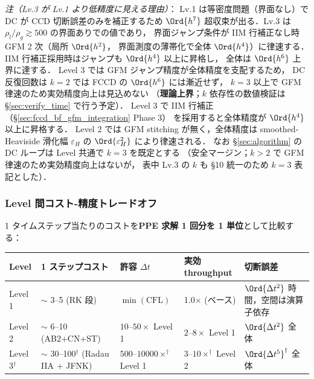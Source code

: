\noindent\textit{注（Lv.3 が Lv.1 より低精度に見える理由）}：
Lv.1 は等密度問題（界面なし）で DC が CCD 切断誤差のみを補正するため
$\Ord{h^7}$ 超収束が出る．Lv.3 は $\rho_l/\rho_g\gtrsim 500$ の界面ありでの値であり，
界面ジャンプ条件が IIM 行補正なし時 GFM 2 次（局所 $\Ord{h^2}$，
界面測度の薄帯化で全体 $\Ord{h^4}$）に律速する．
IIM 行補正採用時はジャンプも $\Ord{h^4}$ 以上に昇格し，
全体は $\Ord{h^6}$ 上界に達する．
Level 3 では GFM ジャンプ精度が全体精度を支配するため，
DC 反復回数は $k=2$ では FCCD の $\Ord{h^6}$ には漸近せず，
$k=3$ 以上で GFM 律速のため実効精度向上は見込めない
（\textbf{理論上界}；$k$ 依存性の数値検証は
\S\ref{sec:verify_time} で行う予定）．
Level 3 で IIM 行補正（\S\ref{sec:fccd_bf_gfm_integration} Phase 3）
を採用すると全体精度が $\Ord{h^4}$ 以上に昇格する．
Level 2 では GFM stitching が無く，全体精度は smoothed-Heaviside 滑化幅
$\varepsilon_H$ の $\Ord{\varepsilon_H^2}$ により律速される．
なお \S\ref{sec:algorithm} の DC ループは Level 共通で $k=3$ を既定とする
（安全マージン；$k>2$ で GFM 律速のため実効精度向上はないが，
表中 Lv.3 の $k$ も §10 統一のため $k=3$ 表記とした）．

\subsubsection{Level 間コスト-精度トレードオフ}
\label{sec:level_cost_accuracy}

1 タイムステップ当たりのコストを\textbf{PPE 求解 1 回分を 1 単位}として比較する：

\begin{center}
\footnotesize
\begin{tabular}{@{}p{1.2cm}p{3.1cm}p{2.4cm}p{2.5cm}p{3.4cm}@{}}
\hline
Level & 1 ステップコスト & 許容 $\Delta t$ & 実効 throughput & 切断誤差 \\
\hline
Level 1 & $\sim$ 3--5 (RK 段) &
  $\min(\text{CFL})$ & 1.0× (ベース) &
  $\Ord{\Delta t^2}$ 時間，空間は演算子依存 \\
Level 2 & $\sim$ 6--10 (AB2+CN+ST) &
  $10$--$50\times$ Level 1 & $2$--$8\times$ Level 1 &
  $\Ord{\Delta t^2}$ 全体 \\
Level 3$^{\dagger}$ & $\sim$ 30--100$^{\dagger}$ (Radau IIA + JFNK) &
  $500$--$10000\times^{\dagger}$ Level 1 & $3$--$10\times^{\dagger}$ Level 2 &
  $\Ord{\Delta t^5}^{\dagger}$ 全体 \\
\hline
\end{tabular}
\end{center}

